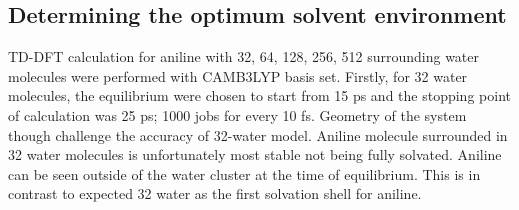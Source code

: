 \documentclass[
journal=jpcbfk, %
manuscript=article]{achemso}
\begin{document}
\subsection{Determining the optimum solvent environment}
TD-DFT calculation for aniline with 32, 64, 128, 256, 512 surrounding water molecules were performed with CAMB3LYP basis set. Firstly, for 32 water molecules, the equilibrium were chosen to start from 15 ps and the stopping point of calculation was 25 ps; 1000 jobs for every 10 fs.  Geometry of the system though challenge the accuracy of 32-water model. Aniline molecule surrounded in 32 water molecules is unfortunately most stable not being fully solvated. Aniline can be seen outside of the water cluster at the time of equilibrium. This is in contrast to expected 32 water as the first solvation shell for aniline. \cite{Plugatyr2009} 
\end{document}
